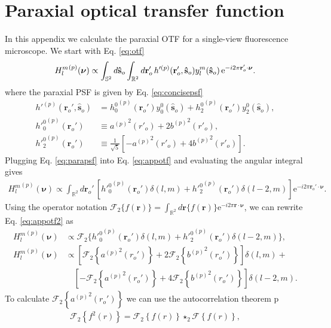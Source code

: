 \documentclass[11pt]{article}
\newcommand{\me}{\mathrm{e}}
\providecommand{\mb}[1]{\mathbf{#1}}
\providecommand{\ro}[1]{\mathbf{\mathbf{r}}_o}
\providecommand{\so}[1]{\mathbf{\hat{s}}_o}
\providecommand{\bs}[1]{\boldsymbol{#1}}
\begin{document}
\section{Paraxial optical transfer function}\label{paraxialotf2}    
In this appendix we calculate the paraxial OTF for a single-view fluorescence
microscope. We start with Eq. \ref{eq:otf}
\begin{align}
  {H_l^m}^{(p)}(\bs{\nu}) \propto \int_{\mathbb{S}^2}d\so{}\int_{\mathbb{R}^2}d\ro{}'\, h'^{(p)}(\ro{}', \so{}) y_l^m(\so{})\thinspace\me^{-i 2\pi \ro{}'\cdot\bs{\nu}}.
  \label{eq:appotf}
\end{align}
where the paraxial PSF is given by Eq. \ref{eq:concisepsf}
\begin{align}
  h'^{(p)}(\ro{}', \so{}) &= {h_0^0}^{(p)}(\ro{}')y_0^0(\so{}) + {h_2^0}^{(p)}(\ro{}')y_2^0(\so{}), \label{eq:parapsf} \\ 
  {{h'}_0^0}^{(p)}(\ro{}') &\equiv {a^{(p)}}^2(r'_o) + 2{b^{(p)}}^2(r'_o),\\
  {{h'}_2^0}^{(p)}(\ro{}') &\equiv \frac{1}{\sqrt{5}}\left[- {a^{(p)}}^2(r'_o) + 4{b^{(p)}}^2(r'_o)\right]. 
\end{align}
Plugging Eq. \ref{eq:parapsf} into Eq. \ref{eq:appotf} and evaluating the
angular integral gives
\begin{align}
  {H_l^m}^{(p)}(\bs{\nu}) \propto \int_{\mathbb{R}^2}d\ro{}'\, \left[{{h'}_0^0}^{(p)}(\ro{}')\delta(l, m) + {{h'}_2^0}^{(p)}(\ro{}')\delta(l-2, m)\right] \me^{-i 2\pi \ro{}'\cdot\bs{\nu}}. \label{eq:appotf2}
\end{align}
Using the operator notation $\mathcal{F}_2\{f(\mb{r})\} = \int_{\mathbb{R}^2}d\mb{r}\{f(\mb{r})\}\me^{-i 2\pi \mb{r}\cdot\bs{\nu}}$, we can rewrite Eq. \ref{eq:appotf2} as 
\begin{align}
  {H_l^m}^{(p)}(\bs{\nu}) &\propto \mathcal{F}_2\{{{h'}_0^0}^{(p)}(\ro{}')\delta(l, m) + {{h'}_2^0}^{(p)}(\ro{}')\delta(l-2, m) \},\\
  {H_l^m}^{(p)}(\bs{\nu}) &\propto \left[\mathcal{F}_2\left\{{a^{(p)}}^2(r_o')\right\} + 2\mathcal{F}_2\left\{{b^{(p)}}^2(r_o')\right\}\right]\delta(l, m) + \\&\hspace{1em}\left[-\mathcal{F}_2\left\{{a^{(p)}}^2(r_o')\right\} + 4\mathcal{F}_2\left\{{b^{(p)}}^2(r_o')\right\}\right]\delta(l-2, m).
\end{align}
To calculate $\mathcal{F}_2\left\{{a^{(p)}}^2(r_o')\right\}$ we can use the
autocorrelation theorem \cite{goodman1996}
p\begin{align}
  \mathcal{F}_2\left\{f^2(r)\right\} = \mathcal{F}_2\left\{f(r)\right\} \star_2 \mathcal{F}\left\{f(r)\right\},
\end{align}
\end{document}

